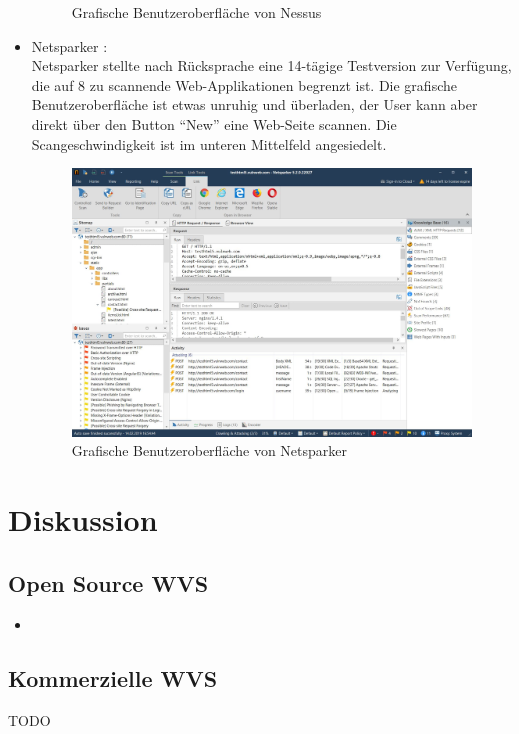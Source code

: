 \documentclass[12pt,oneside,a4paper,parskip]{scrbook}
\begin{document}
\begin{itemize}
\begin{figure}[H]
            \caption[Grafische Benutzeroberfläche von Nessus]{Grafische Benutzeroberfläche von Nessus}
          \end{figure}
        \item Netsparker \cite{Netsparker}:\\
          Netsparker stellte nach Rücksprache eine 14-tägige Testversion zur Verfügung, die auf 8 zu scannende Web-Applikationen begrenzt ist. Die grafische Benutzeroberfläche ist etwas unruhig und überladen, der User kann aber direkt über den Button ``New'' eine Web-Seite scannen. Die Scangeschwindigkeit ist im unteren Mittelfeld angesiedelt.
          \begin{figure}[H]
            \includegraphics[width=1\textwidth]{Images/Netsparker}
            \caption[Grafische Benutzeroberfläche von Netsparker]{Grafische Benutzeroberfläche von Netsparker}
          \end{figure}
     \end{itemize}

\chapter{Diskussion}
  \section{Open Source WVS}
    \begin{itemize}
      \item

    \end{itemize}
  \section{Kommerzielle WVS}
  TODO
\end{document}
